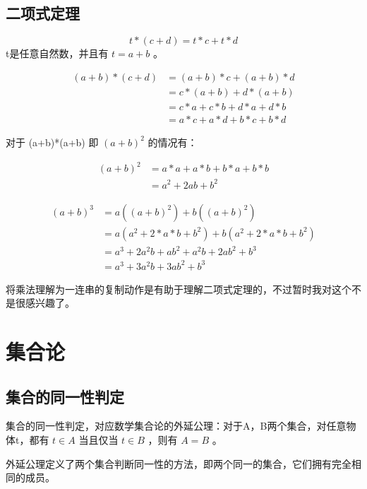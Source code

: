 \documentclass[12pt,oneside]{book}
\begin{document}
\section{二项式定理}
\begin{equation*}
t*(c + d) = t*c + t*d
\end{equation*}
t是任意自然数，并且有 $t=a+b$ 。

\begin{align*}
(a+b)*(c + d) &= (a+b)*c + (a+b)*d\\
                    &=c*(a+b) + d*(a+b)\\
                    &=c*a + c* b + d*a + d*b\\
                    &=a*c + a*d + b*c + b*d
\end{align*}

对于 (a+b)*(a+b) 即 $(a+b)^2$ 的情况有：

\begin{align*}
(a+b)^2 &= a*a + a*b + b*a + b*b\\
    &=a^2 + 2ab + b^2 
\end{align*}



\begin{align*}
(a+b)^3 &= a((a+b)^2) + b((a+b)^2)\\
    &=a(a^2 + 2 * a * b + b^2 )  + b(a^2 + 2 * a * b + b^2 )\\
    &=a^3 + 2a^2b + ab^2 + a^2b + 2ab^2 + b^3\\
    &=a^3 + 3a^2b + 3ab^2 + b^3
\end{align*}

将乘法理解为一连串的复制动作是有助于理解二项式定理的，不过暂时我对这个不是很感兴趣了。












\chapter{集合论}
\section{集合的同一性判定}
集合的同一性判定，对应数学集合论的外延公理：对于A，B两个集合，对任意物体t，都有 $t \in A$ 当且仅当 $t \in B$ ，则有 $A=B$ 。

外延公理定义了两个集合判断同一性的方法，即两个同一的集合，它们拥有完全相同的成员。
\end{document}
